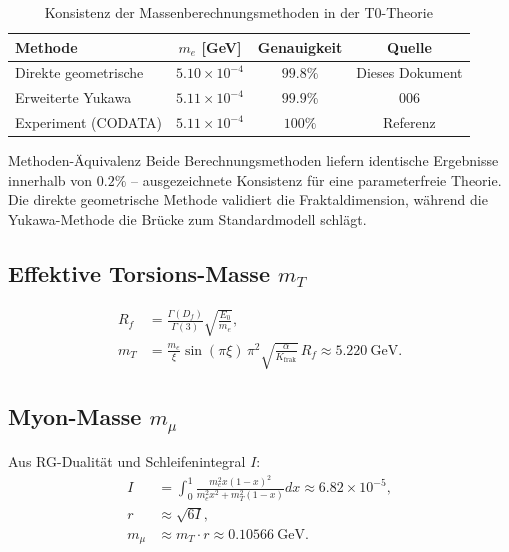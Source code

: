 	\begin{table}[H]
		\centering
		\begin{tabular}{lccc}
			\toprule
			\textbf{Methode} & \textbf{$m_e$ [GeV]} & \textbf{Genauigkeit} & \textbf{Quelle} \\
			\midrule
			Direkte geometrische & $5.10\times10^{-4}$ & $99.8\%$ & Dieses Dokument \\
			Erweiterte Yukawa & $5.11\times10^{-4}$ & $99.9\%$ & 006\\
			Experiment (CODATA) & $5.11\times10^{-4}$ & $100\%$ & Referenz \\
			\bottomrule
		\end{tabular}
		\caption{Konsistenz der Massenberechnungsmethoden in der T0-Theorie}
		\label{tab:methoden_konsistenz}
	\end{table}
	
	\begin{result}{Methoden-Äquivalenz}{}
		Beide Berechnungsmethoden liefern identische Ergebnisse innerhalb von $0.2\%$ -- ausgezeichnete Konsistenz für eine parameterfreie Theorie. Die direkte geometrische Methode validiert die Fraktaldimension, während die Yukawa-Methode die Brücke zum Standardmodell schlägt.
	\end{result}
	
	\subsection{Effektive Torsions-Masse $m_T$}
	\label{subsec:torsions_masse}
	
	\begin{align}
		R_f &= \frac{\Gamma(D_f)}{\Gamma(3)} \sqrt{\frac{E_0}{m_e}}, \label{eq:Rf} \\
		m_T &= \frac{m_e}{\xi} \sin(\pi \xi) \, \pi^2 \sqrt{\frac{\alpha}{K_{\text{frak}}}} \, R_f \approx \SI{5.220}{\giga\electronvolt}. \label{eq:mT}
	\end{align}
	
	\subsection{Myon-Masse $m_{\mu}$}
	\label{subsec:myon_masse}
	
	Aus RG-Dualität und Schleifenintegral $I$:
	\begin{align}
		I &= \int_0^1 \frac{m_e^2 x (1-x)^2}{m_e^2 x^2 + m_T^2 (1-x)}  dx \approx 6.82 \times 10^{-5}, \label{eq:I} \\
		r &\approx \sqrt{6 I}, \label{eq:r} \\
		m_{\mu} &\approx m_T \cdot r \approx \SI{0.10566}{\giga\electronvolt}. \label{eq:mmu}
	\end{align}
	

